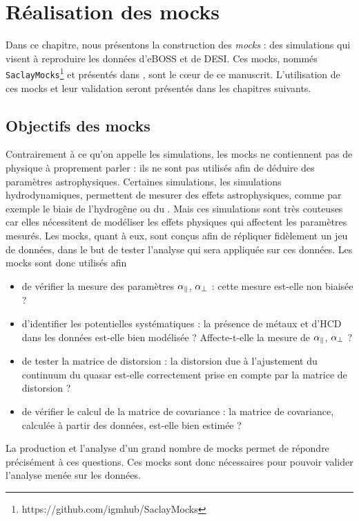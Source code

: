 \documentclass[11pt, twoside, a4paper, openright]{report}
\begin{document}

\graphicspath{ {../figures/donnees/} }

\chapter{Réalisation des mocks}
\minitoc
\newpage
\thispagestyle{fancy}

Dans ce chapitre, nous présentons la construction des \emph{mocks} : des simulations qui visent à reproduire les données d'eBOSS et de DESI. Ces mocks, nommés \texttt{SaclayMocks}\footnote{https://github.com/igmhub/SaclayMocks} et présentés dans \citet{CITE:mocks}, sont le c{\oe}ur de ce manuscrit. L'utilisation de ces mocks et leur validation seront présentés dans les chapitres suivants.

\section{Objectifs des mocks}
Contrairement à ce qu'on appelle les simulations, les mocks ne contiennent pas de physique à proprement parler : ils ne sont pas utilisés afin de déduire des paramètres astrophysiques. Certaines simulations, les simulations hydrodynamiques, permettent de mesurer des effets astrophysiques, comme par exemple le biais de l'hydrogêne ou du \lya{}. Mais ces simulations sont très couteuses car elles nécessitent de modéliser les effets physiques qui affectent les paramètres mesurés.
Les mocks, quant à eux, sont conçus afin de répliquer fidèlement un jeu de données, dans le but de tester l'analyse qui sera appliquée sur ces données.
Les mocks sont donc utilisés afin
\begin{itemize}[label=$\bullet$]
\item de vérifier la mesure des paramètres $\alpha_{\parallel}{}$, $\alpha_{\perp}{}$ : cette mesure est-elle non biaisée ?
\item d'identifier les potentielles systématiques : la présence de métaux et d'HCD dans les données est-elle bien modélisée ? Affecte-t-elle la mesure de $\alpha_{\parallel}{}$, $\alpha_{\perp}{}$ ?
\item de tester la matrice de distorsion : la distorsion due à l'ajustement du continuum du quasar est-elle correctement prise en compte par la matrice de distorsion ?
\item de vérifier le calcul de la matrice de covariance : la matrice de covariance, calculée à partir des données, est-elle bien estimée ?
\end{itemize}
La production et l'analyse d'un grand nombre de mocks permet de répondre précisément à ces questions. Ces mocks sont donc nécessaires pour pouvoir valider l'analyse menée sur les données.
\end{document}

